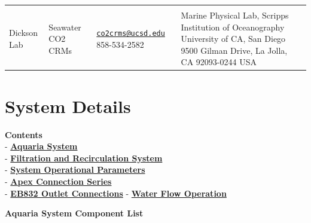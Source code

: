 \documentclass[]{book}
\begin{document}
\begin{longtable}[]{@{}llll@{}}
\begin{minipage}[t]{0.18\columnwidth}
\end{minipage}\tabularnewline
\begin{minipage}[t]{0.18\columnwidth}\raggedright\strut
Dickson Lab\strut
\end{minipage} & \begin{minipage}[t]{0.25\columnwidth}\raggedright\strut
Seawater CO2 CRMs\strut
\end{minipage} & \begin{minipage}[t]{0.28\columnwidth}\raggedright\strut
\href{mailto:co2crms@ucsd.edu}{\nolinkurl{co2crms@ucsd.edu}}
858-534-2582\strut
\end{minipage} & \begin{minipage}[t]{0.18\columnwidth}\raggedright\strut
Marine Physical Lab, Scripps Institution of Oceanography University of
CA, San Diego 9500 Gilman Drive, La Jolla, CA 92093-0244 USA\strut
\end{minipage}\tabularnewline
\bottomrule
\end{longtable}

\hypertarget{system-details}{\chapter{System
Details}\label{system-details}}

\textbf{Contents}\\
- \protect\hyperlink{Aquaria_System_List}{\textbf{Aquaria System}}\\
-
\protect\hyperlink{Filtration_and_Recirculation_System}{\textbf{Filtration
and Recirculation System}}\\
- \protect\hyperlink{System_Operational_Parameters}{\textbf{System
Operational Parameters}}\\
- \protect\hyperlink{Apex_Connection_Series}{\textbf{Apex Connection
Series}}\\
- \protect\hyperlink{EB832_Outlet_Connections}{\textbf{EB832 Outlet
Connections}} - \protect\hyperlink{Water_Flow_Operation}{\textbf{Water
Flow Operation}}

 \textbf{Aquaria System Component List}
\end{document}
